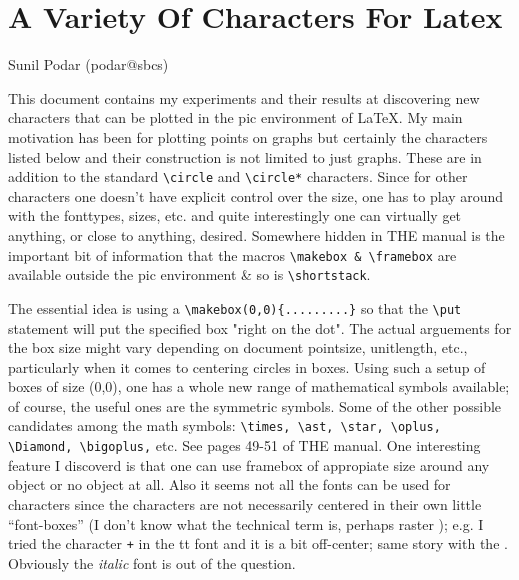 \setlength{\topmargin}{.25in}
\setlength{\oddsidemargin}{0in}  %
\setlength{\headheight}{.75in}
\setlength{\headsep}{.5in}
\setlength{\textheight}{8in}
\setlength{\textwidth}{5.5in} 
\setlength{\marginparwidth}{0in}
\setlength{\marginparsep}{0in}
\setlength{\marginparpush}{0in}
\renewcommand{\baselinestretch}{1.5}  %


\newcommand{\circlems}{\circle{1.0}}
\newcommand{\circlescs}{\circle{2.0}}
\newcommand{\circlecs}{\circle*{1.0}}
\setlength{\unitlength}{1mm}

\section*{A Variety Of Characters For Latex}

{\raggedleft Sunil Podar (podar@sbcs)}

\medskip
This document contains my experiments and their results at 
discovering new characters that can be plotted in the pic environment of 
LaTeX. My main motivation has been for plotting points on graphs but
certainly the characters listed below and their construction is not limited
to just graphs.
These are in addition to the
standard \verb+\circle+ and \verb+\circle*+ characters. Since for other 
characters one
doesn't have explicit control over the size, one has to play around with the
fonttypes, sizes, etc. and quite interestingly one can virtually get
anything, or close to anything, desired. Somewhere hidden in THE manual is the
important bit of information that the macros \verb+\makebox & \framebox+ are
available outside the pic environment \& so is \verb+\shortstack+.

\medskip
The essential idea is using a \verb+\makebox(0,0){.........}+ so that the 
\verb+\put+
statement will put the specified box "right on the dot". The actual arguements
for the box size might vary depending on document pointsize, unitlength,
etc., particularly when it comes to centering circles in boxes.
Using such a setup of boxes of size (0,0), one has a whole new range
of mathematical symbols available; of course, the useful ones are the 
symmetric symbols. 
Some of the other possible candidates among the math symbols:
\verb+\times, \ast, \star, \oplus, \Diamond, \bigoplus,+ etc.
See pages 49-51 of THE manual.
One interesting feature I discoverd is that
one can use framebox of appropiate size around any object or no object at all.
Also it seems not all the fonts can be used for characters since the
characters are not necessarily centered in their own little ``font-boxes'' (I
don't know what the technical term is, perhaps raster ); e.g. I tried the
character {\tt +} in the tt font and it is a bit off-center; same story with
the {\tt *}. Obviously the {\it italic} font is out of the question.

